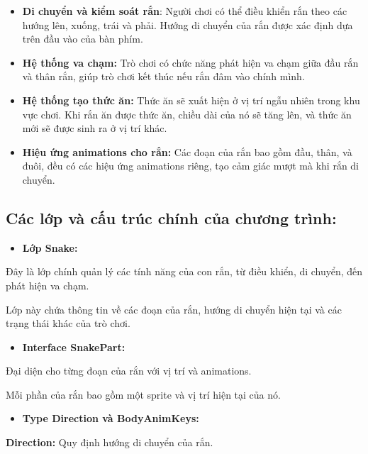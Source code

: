\documentclass[a4paper, 12pt]{article}
\begin{document}
\begin{itemize}
    \item \textbf{Di chuyển và kiểm soát rắn}: Người chơi có thể điều khiển rắn theo các hướng lên, xuống, trái và phải. Hướng di chuyển của rắn được xác định dựa trên đầu vào của bàn phím.

    \item \textbf{Hệ thống va chạm:} Trò chơi có chức năng phát hiện va chạm giữa đầu rắn và thân rắn, giúp trò chơi kết thúc nếu rắn đâm vào chính mình.

    \item \textbf{Hệ thống tạo thức ăn:} Thức ăn sẽ xuất hiện ở vị trí ngẫu nhiên trong khu vực chơi. Khi rắn ăn được thức ăn, chiều dài của nó sẽ tăng lên, và thức ăn mới sẽ được sinh ra ở vị trí khác.

    \item \textbf{Hiệu ứng animations cho rắn:} Các đoạn của rắn bao gồm đầu, thân, và đuôi, đều có các hiệu ứng animations riêng, tạo cảm giác mượt mà khi rắn di chuyển.
\end{itemize}

\subsection{Các lớp và cấu trúc chính của chương trình:}

\begin{itemize}
    \item \textbf{Lớp Snake:}
\end{itemize}

Đây là lớp chính quản lý các tính năng của con rắn, từ điều khiển, di chuyển, đến phát hiện va chạm.

Lớp này chứa thông tin về các đoạn của rắn, hướng di chuyển hiện tại và các trạng thái khác của trò chơi.

\begin{itemize}
    \item \textbf{Interface SnakePart:}
\end{itemize}

Đại diện cho từng đoạn của rắn với vị trí và animations.

Mỗi phần của rắn bao gồm một sprite và vị trí hiện tại của nó.

\begin{itemize}
    \item \textbf{Type Direction và BodyAnimKeys:}
\end{itemize}

\textbf{Direction:} Quy định hướng di chuyển của rắn.
\end{document}
